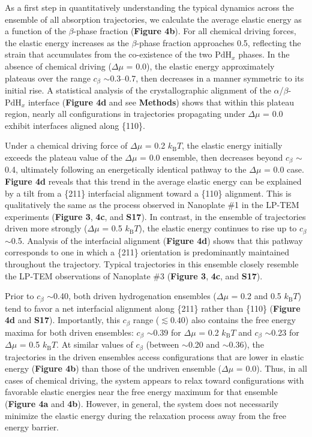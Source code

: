 \documentclass[reprint,amsmath,amssymb,aip,nofootinbib, citeautoscript,]{revtex4-2}
\begin{document}
As a first step in quantitatively understanding the typical dynamics across the ensemble of all absorption trajectories, we calculate the average elastic energy as a function of the $\beta$-phase fraction (\textbf{Figure 4b}). For all chemical driving forces, the elastic energy increases as the $\beta$-phase fraction approaches 0.5, reflecting the strain that accumulates from the co-existence of the two $\mathrm{PdH}_x$ phases. In the absence of chemical driving ($\Delta$$\mu$ = 0.0), the elastic energy approximately plateaus over the range $c_\beta$ $\sim$0.3–0.7, then decreases in a manner symmetric to its initial rise. A statistical analysis of the crystallographic alignment of the $\alpha$/$\beta$-$\mathrm{PdH}_x$ interface (\textbf{Figure 4d} and see \textbf{Methods}) shows that within this plateau region, nearly all configurations in trajectories propagating under $\Delta$$\mu$ = 0.0 exhibit interfaces aligned along \{110\}.


Under a chemical driving force of $\Delta$$\mu$ = 0.2 $k_\mathrm{B}T$, the elastic energy initially exceeds the plateau value of the $\Delta$$\mu$ = 0.0 ensemble, then decreases beyond $c_\beta$ $\sim$0.4, ultimately following an energetically identical pathway to the $\Delta$$\mu$ = 0.0 case. \textbf{Figure 4d} reveals that this trend in the average elastic energy can be explained by a tilt from a \{211\} interfacial alignment toward a \{110\} alignment. This is qualitatively the same as the process observed in Nanoplate \#1 in the LP-TEM experiments (\textbf{Figure 3}, \textbf{4c}, and \textbf{S17}). In contrast, in the ensemble of trajectories driven more strongly ($\Delta$$\mu$ = 0.5 $k_\mathrm{B}T$), the elastic energy continues to rise up to $c_\beta$ $\sim$0.5. Analysis of the interfacial alignment (\textbf{Figure 4d}) shows that this pathway corresponds to one in which a \{211\} orientation is predominantly maintained throughout the trajectory. Typical trajectories in this ensemble closely resemble the LP-TEM observations of Nanoplate \#3 (\textbf{Figure 3}, \textbf{4c}, and \textbf{S17}).


Prior to $c_\beta$ $\sim$0.40, both driven hydrogenation ensembles ($\Delta$$\mu$ = 0.2 and 0.5 $k_\mathrm{B}T$) tend to favor a net interfacial alignment along \{211\} rather than \{110\} (\textbf{Figure 4d} and \textbf{S17}). Importantly, this $c_\beta$ range ($\lesssim 0.40$) also contains the free energy maxima for both driven ensembles: $c_\beta$ $\sim$0.39 for $\Delta$$\mu$ = 0.2 $k_\mathrm{B}T$ and $c_\beta$ $\sim$0.23 for $\Delta$$\mu$ = 0.5 $k_\mathrm{B}T$. At similar values of $c_\beta$ (between $\sim$0.20 and $\sim$0.36), the trajectories in the driven ensembles access configurations that are lower in elastic energy (\textbf{Figure 4b}) than those of the undriven ensemble ($\Delta$$\mu$ = 0.0). Thus, in all cases of chemical driving, the system appears to relax toward configurations with favorable elastic energies near the free energy maximum for that ensemble (\textbf{Figure 4a} and \textbf{4b}). However, in general, the system does not necessarily minimize the elastic energy during the relaxation process away from the free energy barrier.
\end{document}

